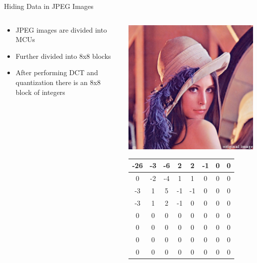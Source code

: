 \begin{frame}{Hiding Data in JPEG Images}{}
	\begin{minipage}[0.5\textheight]{\textwidth}
		\begin{columns}[T]
			\begin{column}{0.5\textwidth}
				\vspace{.56mm}
				\begin{itemize}
					\item JPEG images are divided into MCUs
					\item Further divided into 8x8 blocks
					\item After performing DCT and quantization there is an 8x8 block of integers
				\end{itemize}
			\end{column}
			\begin{column}{0.5\textwidth}
				\begin{center}
					\includegraphics[width=.5\textwidth]{figures/lena_color.jpg}
				\end{center}
				{\tiny \begin{table}[]
				\centering
					\begin{tabular}{|c|c|c|c|c|c|c|c|}
					\hline
					-26 & -3 & -6 & 2  & 2  & -1 & 0 & 0 \\ \hline
					0   & -2 & -4 & 1  & 1  & 0  & 0 & 0 \\ \hline
					-3  & 1  & 5  & -1 & -1 & 0  & 0 & 0 \\ \hline
					-3  & 1  & 2  & -1 & 0  & 0  & 0 & 0 \\ \hline
					0   & 0  & 0  & 0  & 0  & 0  & 0 & 0 \\ \hline
					0   & 0  & 0  & 0  & 0  & 0  & 0 & 0 \\ \hline
					0   & 0  & 0  & 0  & 0  & 0  & 0 & 0 \\ \hline
					0   & 0  & 0  & 0  & 0  & 0  & 0 & 0 \\ \hline

\end{tabular}
\end{table}}
\end{column}
\end{columns}
\end{minipage}
\end{frame}
